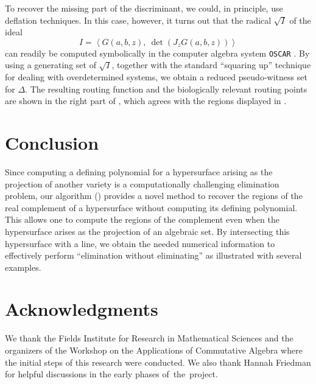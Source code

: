 \documentclass[11pt]{article}
\numberwithin{equation}{section}
\theoremstyle{plain}
\theoremstyle{definition}
\theoremstyle{remark}
\begin{document}
To recover the missing part of the discriminant, we could, in principle, use deflation techniques. In this case, however, it turns out that the radical $\sqrt{I}$ of the ideal 
$$I=\left\langle G(a,b,z),\ \det (J_zG(a,b,z))\right\rangle$$
can readily be computed symbolically in the computer algebra system \texttt{OSCAR} \cite{OSCAR,OSCAR-book}. By using a generating set of $\sqrt{I}$, together with the standard ``squaring up'' technique \cite[Section~2.5]{bates2024numericalnonlinearalgebra} for dealing with overdetermined systems, we obtain a reduced pseudo-witness set for $\Delta$. The resulting routing function and the biologically relevant routing points are shown in the right part of , which agrees with the regions displayed in \cite[Figure~3]{alleethreepopulations}.


\section{Conclusion}\label{sec:Conclusion}

Since computing a defining
polynomial for a hypersurface
arising as the projection
of another variety is a 
computationally challenging
elimination problem,
our algorithm ()
provides a novel method to recover the regions of the real complement of a hypersurface without computing its defining polynomial. This allows one to compute the regions of the complement
even when the hypersurface arises as the projection of an algebraic set. By intersecting this hypersurface with a line, we obtain the needed numerical information to effectively perform ``elimination without eliminating''
as illustrated with several examples. 

\section*{Acknowledgments}\label{sec:Ack}
We thank the Fields Institute for Research in Mathematical Sciences and the organizers of the Workshop on the Applications of Commutative Algebra where the initial steps of this research were conducted. 
We also thank Hannah Friedman for helpful discussions in the early phases of~the~project. 
\end{document}
